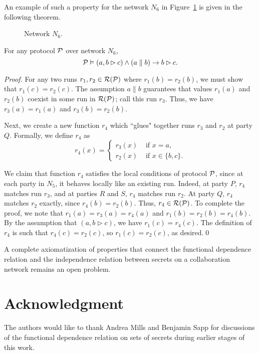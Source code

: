 \documentclass{llncs}
\newcommand{\rr}{{\cal R}}
\newcommand{\pp}{{\cal P}}
\begin{document}
An example of such a property for the network $N_6$ in Figure~\ref{linear_graph} is given in the following theorem.
\begin{figure}[htbp]
   \centering
   \caption{Network $N_6$.}
   \label{linear_graph}
\end{figure}
\begin{theorem}\label{concl thm}
For any protocol $\pp$ over network $N_6$, 
$$\pp \vDash (a,b\rhd c) \wedge (a \parallel b) \rightarrow b \rhd c.$$
\end{theorem}
\begin{proof}
For any two runs $r_1,r_2 \in \rr(\pp)$ where $r_1(b) = r_2(b)$, we must show that $r_1(c) = r_2(c)$.  The assumption $a \parallel b$ guarantees that values $r_1(a)$ and $r_2(b)$ coexist in some run in $\rr(\pp)$; call this run $r_3$.  Thus, we have $r_3(a)= r_1(a)$ and $r_3(b) =r_2(b)$.  

Next, we create a new function $r_4$ which ``glues" together runs $r_3$ and $r_2$ at party $Q$.  Formally, we define $r_4$ as 
$$r_4(x)=\left\{\begin{array}{ll}
                            r_3(x)     & \mbox{ if $x=a$},\\
                            r_2(x)     & \mbox{ if $x\in \{b,c\}$}.
                            \end{array}
                     \right. $$


We claim that function $r_4$ satisfies the local conditions of protocol $\pp$, since at each party in $N_5$, it behaves locally like an existing run.  Indeed, at party $P$, $r_4$ matches run $r_3$, and at parties $R$ and $S$, $r_4$ matches run $r_2$.  At party $Q$, $r_4$ matches $r_2$ exactly, since $r_4(b)=r_2(b)$.  Thus, $r_4 \in \rr(\pp)$.  To complete the proof, we note that $r_1(a)=r_3(a)=r_4(a)$ and $r_1(b)=r_2(b)=r_4(b)$.  By the assumption that $(a,b\rhd c)$, we have $r_1(c) =r_4(c)$.  The definition of $r_4$ is such that $r_4(c)=r_2(c)$, so $r_1(c)=r_2(c)$, as desired.\qed 
\end{proof}

A complete axiomatization of properties that connect the functional dependence relation and the independence relation between secrets on a collaboration network remains an open problem. 

\section{Acknowledgment}

The authors would like to thank Andrea Mills and Benjamin Sapp for discussions of the functional dependence relation on sets of secrets during earlier stages of this work.


\end{document}
